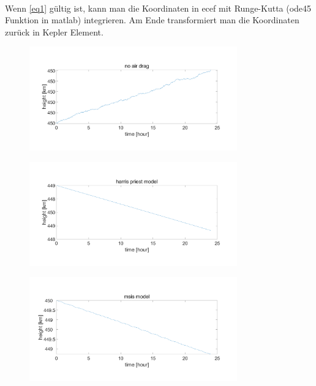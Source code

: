 \documentclass{article}
\begin{document}
\\
Wenn \autoref{eq1} gültig ist, kann man die Koordinaten in ecef mit Runge-Kutta (ode45 Funktion in matlab) integrieren. Am Ende transformiert man die Koordinaten zurück in Kepler Element.
\begin{figure}[H]
	\centering
	\includegraphics[width=0.8\textwidth]{nodrag.png} 
	\caption{} \label{fig:p1}
\end{figure}
\begin{figure}[H]
	\centering
	\includegraphics[width=0.8\textwidth]{hp.png} 
	\caption{} \label{fig:p2}
\end{figure}
\begin{figure}[H]
	\centering
	\includegraphics[width=0.8\textwidth]{msis.png} 
	\caption{} \label{fig:p3}
\end{figure}
\end{document}
